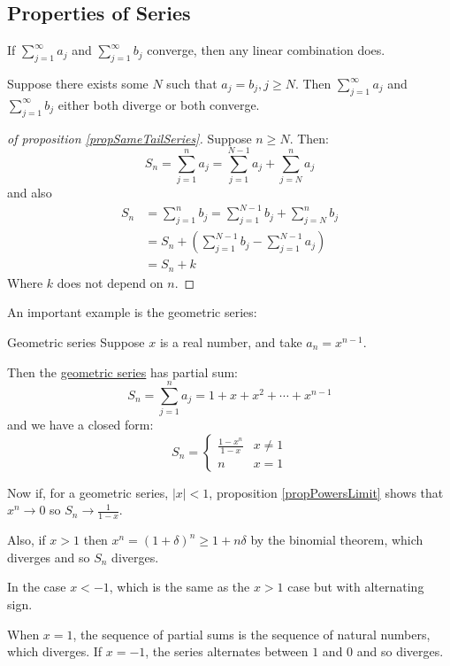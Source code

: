 \documentclass[../Main.tex]{subfiles}
\begin{document}
\subsection{Properties of Series}
\begin{propositions}{
        \label{eqnSeriesProperties}
    }
    \item If $\sum_{j=1}^\infty a_j$ and $\sum_{j=1}^\infty b_j$ converge, then any linear combination does. \label{propSeriesLinearCombo}
    \item Suppose there exists some $N$ such that $a_j = b_j, j \geq N$.
        Then $\sum_{j=1}^\infty a_j$ and $\sum_{j=1}^\infty b_j$ either both diverge or both converge. \label{propSameTailSeries}
\end{propositions}
\begin{proof}[of proposition \ref{propSameTailSeries}]
    Suppose $n \geq N$. Then:
    \begin{equation*}
        S_n = \sum_{j=1}^n a_j = \sum_{j=1}^{N-1}a_j + \sum_{j=N}^{n} a_j
    \end{equation*}
    and also
    \begin{align*}
        S_n &= \sum_{j=1}^n b_j = \sum_{j=1}^{N-1}b_j + \sum_{j=N}^{n} b_j \\
        &= S_n + \left(\sum_{j=1}^{N-1} b_j - \sum_{j=1}^{N-1} a_j\right) \\
        &= S_n + k
    \end{align*}
    Where $k$ does not depend on $n$.
\end{proof}
An important example is the geometric series:
\begin{definition}{Geometric series}
    Suppose $x$ is a real number, and take $a_n = x^{n-1}$.\par
    Then the \underline{geometric series} has partial sum:
    \begin{equation*}
        S_n = \sum_{j=1}^n a_j = 1 + x + x^2 + \cdots + x^{n-1}
    \end{equation*}
    and we have a closed form:
    \begin{equation*}
        S_n =
        \begin{cases}
            \frac{1 - x^n}{1 - x} & x \neq 1 \\
            n & x = 1
        \end{cases}
    \end{equation*}
\end{definition}
Now if, for a geometric series, $|x| < 1$, proposition \ref{propPowersLimit} shows that $x^n \to 0$ so $S_n \to \frac{1}{1-x}$.\par
Also, if $x > 1$ then $x^n = (1 + \delta)^n \geq 1 + n\delta$ by the binomial theorem, which diverges and so $S_n$ diverges.\par
In the case $x < -1$, which is the same as the $x > 1$ case but with alternating sign.\par
When $x = 1$, the sequence of partial sums is the sequence of natural numbers, which diverges. If $x = -1$, the series alternates between $1$ and $0$ and so diverges.
\end{document}
